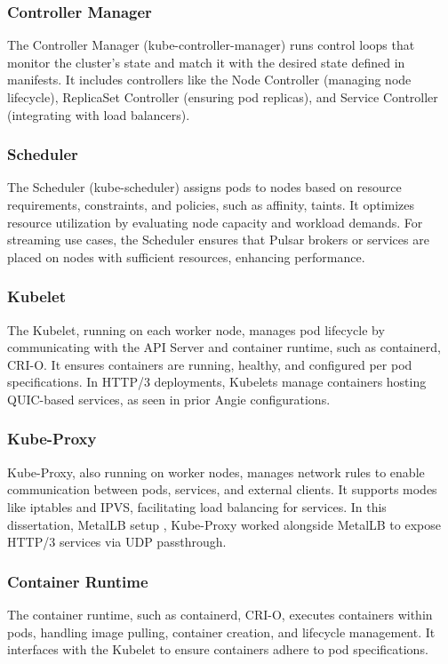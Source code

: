 \subsubsection{Controller Manager}
The Controller Manager (kube-controller-manager) runs control loops that monitor the cluster's state and match it with the desired state defined in manifests. It includes controllers like the Node Controller (managing node lifecycle), ReplicaSet Controller (ensuring pod replicas), and Service Controller (integrating with load balancers). 

\subsubsection{Scheduler}
The Scheduler (kube-scheduler) assigns pods to nodes based on resource requirements, constraints, and policies, such as affinity, taints. It optimizes resource utilization by evaluating node capacity and workload demands. For streaming use cases, the Scheduler ensures that Pulsar brokers or services are placed on nodes with sufficient resources, enhancing performance.

\subsubsection{Kubelet}
The Kubelet, running on each worker node, manages pod lifecycle by communicating with the API Server and container runtime, such as containerd, CRI-O. It ensures containers are running, healthy, and configured per pod specifications. In HTTP/3 deployments, Kubelets manage containers hosting QUIC-based services, as seen in prior Angie configurations.

\subsubsection{Kube-Proxy}
Kube-Proxy, also running on worker nodes, manages network rules to enable communication between pods, services, and external clients. It supports modes like iptables and IPVS, facilitating load balancing for services. In this dissertation, MetalLB setup \cite{metallb-docs}, Kube-Proxy worked alongside MetalLB to expose HTTP/3 services via UDP passthrough.

\subsubsection{Container Runtime}
The container runtime, such as containerd, CRI-O, executes containers within pods, handling image pulling, container creation, and lifecycle management. It interfaces with the Kubelet to ensure containers adhere to pod specifications.

